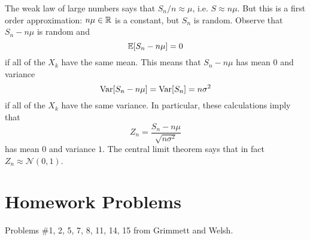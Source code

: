 \begin{remark}
  The weak law of large numbers says that
  $S_n / n \approx \mu$, i.e.
  $S \approx n \mu$. But this is a first order
  approximation: $n \mu \in \mathbb{R}$ is a constant,
  but $S_n$ is random. Observe that
  $S_n - n\mu$ is random and
  \[
    \mathbb{E}[S_n - n\mu] = 0
  \]
  if all of the $X_k$ have the same mean.
  This means that $S_n - n\mu$ has
  mean $0$ and variance
  \[
    \operatorname{Var}[S_n - n\mu]
    = \operatorname{Var}[S_n] = n\sigma^2
  \]
  if all of the $X_k$ have the same variance.
  In particular, these calculations imply that
  \[
    Z_n = \frac{S_n - n\mu}{\sqrt{n\sigma^2}}
  \]
  has mean $0$ and variance $1$. The central
  limit theorem says that in fact
  $Z_n \approx \mathcal{N}(0, 1)$.
\end{remark}

\section{Homework Problems}
Problems \#1, 2, 5, 7, 8, 11, 14, 15
from Grimmett and Welsh.

